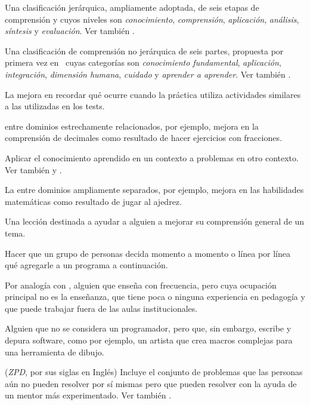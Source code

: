 \begin{description}
 Una clasificación jerárquica, ampliamente adoptada,
de seis etapas de comprensión y cuyos niveles son \emph{conocimiento},
\emph{comprensión}, \emph{aplicación}, \emph{análisis}, \emph{síntesis} y
\emph{evaluación}.
Ver también .

 Una clasificación de comprensión no jerárquica de seis partes, propuesta por primera vez en~\cite{Fink2013} cuyas categorías son \emph{conocimiento fundamental}, \emph{aplicación}, \emph{integración}, \emph{dimensión humana}, \emph{cuidado} y
\emph{aprender a aprender}. Ver también .

 La mejora en  recordar qué ocurre cuando la práctica utiliza actividades similares a las utilizadas en los tests.

  entre dominios estrechamente relacionados, por ejemplo, mejora en la comprensión de decimales como resultado de hacer ejercicios con fracciones.

 Aplicar el conocimiento aprendido en un contexto a problemas en otro contexto.  Ver también
 y .

 La  entre dominios ampliamente separados, por ejemplo, mejora en las habilidades matemáticas como resultado de jugar al ajedrez.

 Una lección destinada a ayudar a alguien a
mejorar su comprensión general de un tema.


Hacer que un grupo de personas decida momento a momento
o línea por línea qué agregarle a un programa a continuación.

 Por analogía con
,
alguien que enseña con frecuencia, pero cuya ocupación principal no es la enseñanza,
que tiene poca o ninguna experiencia en pedagogía y que puede trabajar fuera de las aulas institucionales.

 Alguien que no se considera
un programador, pero que, sin embargo, escribe y depura software, como por ejemplo, un artista que crea macros complejas para una herramienta de dibujo.

 (\emph{ZPD}, por sus siglas en Inglés) Incluye el conjunto de problemas que las personas aún no pueden resolver por sí mismas pero que pueden resolver con la ayuda de un mentor más experimentado.  Ver también .

\end{description}

